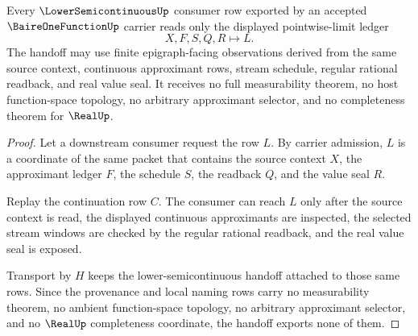 \begin{theorem}
\label{thm:baireonefunction-lowersemicontinuous-handoff}
Every $\LowerSemicontinuousUp$ consumer row exported by an accepted $\BaireOneFunctionUp$ carrier reads only the displayed pointwise-limit ledger
$$
X,F,S,Q,R \longmapsto L .
$$
The handoff may use finite epigraph-facing observations derived from the same source context, continuous approximant rows, stream schedule, regular rational readback, and real value seal. It receives no full measurability theorem, no host function-space topology, no arbitrary approximant selector, and no completeness theorem for $\RealUp$.
\end{theorem}
\begin{proof}
Let a downstream consumer request the row $L$. By carrier admission, $L$ is a coordinate of the same packet that contains the source context $X$, the approximant ledger $F$, the schedule $S$, the readback $Q$, and the value seal $R$.

Replay the continuation row $C$. The consumer can reach $L$ only after the source context is read, the displayed continuous approximants are inspected, the selected stream windows are checked by the regular rational readback, and the real value seal is exposed.

Transport by $H$ keeps the lower-semicontinuous handoff attached to those same rows. Since the provenance and local naming rows carry no measurability theorem, no ambient function-space topology, no arbitrary approximant selector, and no $\RealUp$ completeness coordinate, the handoff exports none of them.
\end{proof}

